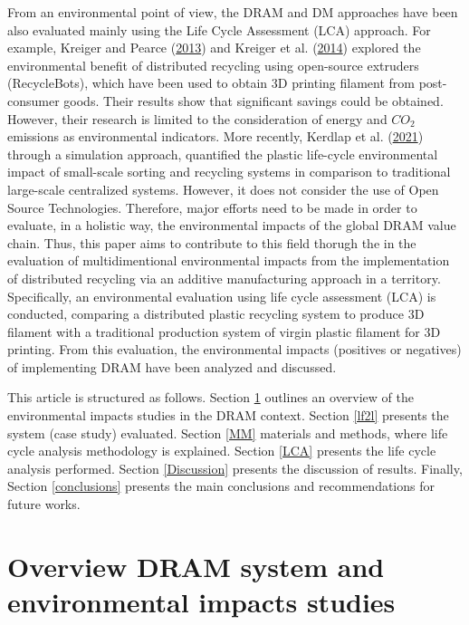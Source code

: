 \documentclass[12pt]{elsarticle} %
\begin{document}
From an environmental point of view, the DRAM and DM approaches have been also evaluated mainly using the Life Cycle Assessment (LCA) approach.
For example, Kreiger and Pearce (\protect\hyperlink{ref-Kreiger2013}{2013}) and Kreiger et al. (\protect\hyperlink{ref-Kreiger2014}{2014}) explored the environmental benefit of distributed recycling using open-source extruders (RecycleBots), which have been used to obtain 3D printing filament from post-consumer goods.
Their results show that significant savings could be obtained. However, their research is limited to the consideration of energy and \(CO_{2}\) emissions as environmental indicators.
More recently, Kerdlap et al. (\protect\hyperlink{ref-Kerdlap2021}{2021}) through a simulation approach, quantified the plastic life-cycle environmental impact of small-scale sorting and recycling systems in comparison to traditional large-scale centralized systems. However, it does not consider the use of Open Source Technologies. Therefore, major efforts need to be made in order to evaluate, in a holistic way, the environmental impacts of the global DRAM value chain. Thus, this paper aims to contribute to this field thorugh the in the evaluation of multidimentional environmental impacts from the implementation of distributed recycling via an additive manufacturing approach in a territory. Specifically, an environmental evaluation using life cycle assessment (LCA) is conducted, comparing a distributed plastic recycling system to produce 3D filament with a traditional production system of virgin plastic filament for 3D printing. From this evaluation, the environmental impacts (positives or negatives) of implementing DRAM have been analyzed and discussed.

This article is structured as follows.
Section \ref{lit} outlines an overview of the environmental impacts studies in the DRAM context.
Section \ref{lf2l} presents the system (case study) evaluated.
Section \ref{MM} materials and methods, where life cycle analysis methodology is explained.
Section \ref{LCA} presents the life cycle analysis performed.
Section \ref{Discussion} presents the discussion of results.
Finally, Section \ref{conclusions} presents the main conclusions and recommendations for future works.

\hypertarget{lit}{%
\section{Overview DRAM system and environmental impacts studies}\label{lit}}
\end{document}
